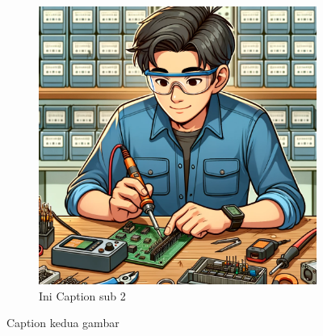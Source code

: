 \begin{figure}[H]
\begin{subfigure}[b]{0.4\linewidth}
    \includegraphics[width=\linewidth]{img/contohgambar.png}
    \caption{Ini Caption sub 2\label{fig:inisub2}}
  \end{subfigure}
  \caption{Caption kedua gambar\label{fig:keduagambar}}
\end{figure}